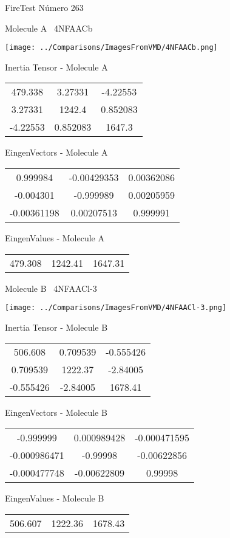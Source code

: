 \vtab[-3cm]
\begin{center}
{\large FireTest \tab Número 263}
\end{center}
\begin{multicols}{2}
\begin{center}

Molecule A \
4NFAACb

\texttt{[image: ../Comparisons/ImagesFromVMD/4NFAACb.png]}

Inertia Tensor - Molecule A \\
\begin{tabular}{|c c c|}
479.338	 & 	3.27331	 & 	-4.22553	 \\
3.27331	 & 	1242.4	 & 	0.852083	 \\
-4.22553	 & 	0.852083	 & 	1647.3
\end{tabular}

\vtab
 EingenVectors - Molecule A     \\
\begin{tabular}{|c c c|}
0.999984	 & 	-0.00429353	 & 	0.00362086	 \\
-0.004301	 & 	-0.999989	 & 	0.00205959	 \\
-0.00361198	 & 	0.00207513	 & 	0.999991
\end{tabular}

\vtab
 EingenValues - Molecule A     \\
\begin{tabular}{|c c c|}
479.308	 & 	1242.41	 & 	1647.31	 \\
\end{tabular}
\columnbreak

Molecule B \
4NFAACl-3

\texttt{[image: ../Comparisons/ImagesFromVMD/4NFAACl-3.png]}

Inertia Tensor - Molecule B \\
\begin{tabular}{|c c c|}
506.608	 & 	0.709539	 & 	-0.555426	 \\
0.709539	 & 	1222.37	 & 	-2.84005	 \\
-0.555426	 & 	-2.84005	 & 	1678.41
\end{tabular}

\vtab
 EingenVectors - Molecule B     \\
\begin{tabular}{|c c c|}
-0.999999	 & 	0.000989428	 & 	-0.000471595	 \\
-0.000986471	 & 	-0.99998	 & 	-0.00622856	 \\
-0.000477748	 & 	-0.00622809	 & 	0.99998
\end{tabular}

\vtab
 EingenValues - Molecule B     \\
\begin{tabular}{|c c c|}
506.607	 & 	1222.36	 & 	1678.43	 \\
\end{tabular}

\end{center}
\end{multicols}

